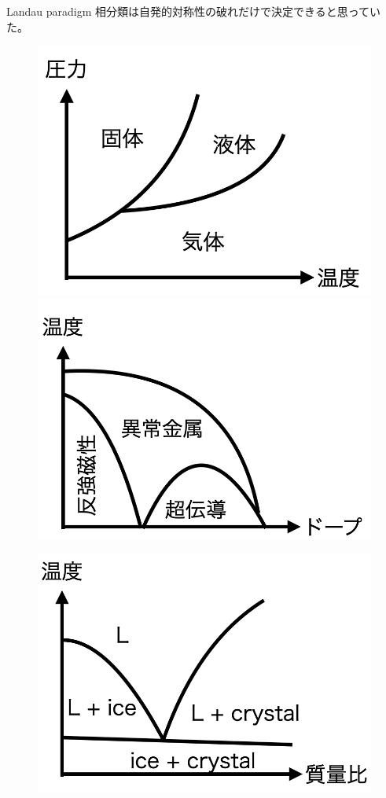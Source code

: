 \documentclass[dvipdfm]{beamer}
\begin{document}
\begin{frame}{Landau paradigm}
    相分類は自発的対称性の破れだけで決定できると思っていた。
    \begin{figure}
        \centering
        \begin{minipage}{0.45\linewidth}
            \centering
            \includegraphics[width=0.8\linewidth]{phase3.png}
        \end{minipage}
        \begin{minipage}{0.45\linewidth}
            \centering
            \includegraphics[width=0.8\linewidth]{phase-mag.png}
        \end{minipage}
    \end{figure}
    \begin{figure}
        \centering
        \begin{minipage}{0.45\linewidth}
            \centering
            \includegraphics[width=0.8\linewidth]{melt.png}

\end{minipage}
\end{figure}
\end{frame}
\end{document}
